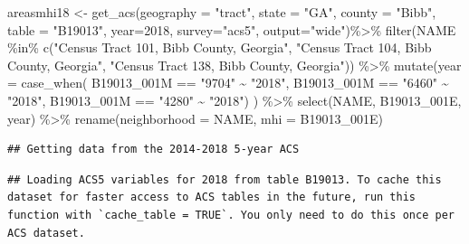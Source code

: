 \documentclass[
]{article}
\newenvironment{Shaded}{\begin{snugshade}}{\end{snugshade}}
\newcommand{\AttributeTok}[1]{\textcolor[rgb]{0.77,0.63,0.00}{#1}}
\newcommand{\DecValTok}[1]{\textcolor[rgb]{0.00,0.00,0.81}{#1}}
\newcommand{\FunctionTok}[1]{\textcolor[rgb]{0.00,0.00,0.00}{#1}}
\newcommand{\NormalTok}[1]{#1}
\newcommand{\OtherTok}[1]{\textcolor[rgb]{0.56,0.35,0.01}{#1}}
\newcommand{\SpecialCharTok}[1]{\textcolor[rgb]{0.00,0.00,0.00}{#1}}
\newcommand{\StringTok}[1]{\textcolor[rgb]{0.31,0.60,0.02}{#1}}
\begin{document}
\begin{Shaded}
\begin{Highlighting}[]
\NormalTok{areasmhi18 }\OtherTok{\textless{}{-}} \FunctionTok{get\_acs}\NormalTok{(}\AttributeTok{geography =} \StringTok{"tract"}\NormalTok{, }\AttributeTok{state =} \StringTok{"GA"}\NormalTok{, }\AttributeTok{county =} \StringTok{"Bibb"}\NormalTok{, }\AttributeTok{table =} \StringTok{"B19013"}\NormalTok{, }\AttributeTok{year=}\DecValTok{2018}\NormalTok{, }\AttributeTok{survey=}\StringTok{"acs5"}\NormalTok{, }\AttributeTok{output=}\StringTok{"wide"}\NormalTok{)}\SpecialCharTok{\%\textgreater{}\%}
\FunctionTok{filter}\NormalTok{(NAME }\SpecialCharTok{\%in\%} \FunctionTok{c}\NormalTok{(}\StringTok{"Census Tract 101, Bibb County, Georgia"}\NormalTok{, }\StringTok{"Census Tract 104, Bibb County, Georgia"}\NormalTok{, }\StringTok{"Census Tract 138, Bibb County, Georgia"}\NormalTok{)) }\SpecialCharTok{\%\textgreater{}\%}
\FunctionTok{mutate}\NormalTok{(}\AttributeTok{year =} \FunctionTok{case\_when}\NormalTok{(}
\NormalTok{  B19013\_001M }\SpecialCharTok{==} \StringTok{"9704"} \SpecialCharTok{\textasciitilde{}} \StringTok{"2018"}\NormalTok{,}
\NormalTok{  B19013\_001M }\SpecialCharTok{==} \StringTok{"6460"} \SpecialCharTok{\textasciitilde{}} \StringTok{"2018"}\NormalTok{,}
\NormalTok{  B19013\_001M }\SpecialCharTok{==} \StringTok{"4280"} \SpecialCharTok{\textasciitilde{}} \StringTok{"2018"}\NormalTok{) ) }\SpecialCharTok{\%\textgreater{}\%}
\FunctionTok{select}\NormalTok{(NAME, B19013\_001E, year) }\SpecialCharTok{\%\textgreater{}\%}
\FunctionTok{rename}\NormalTok{(}\AttributeTok{neighborhood =}\NormalTok{ NAME, }\AttributeTok{mhi =}\NormalTok{ B19013\_001E) }
\end{Highlighting}
\end{Shaded}

\begin{verbatim}
## Getting data from the 2014-2018 5-year ACS
\end{verbatim}

\begin{verbatim}
## Loading ACS5 variables for 2018 from table B19013. To cache this dataset for faster access to ACS tables in the future, run this function with `cache_table = TRUE`. You only need to do this once per ACS dataset.
\end{verbatim}
\end{document}
